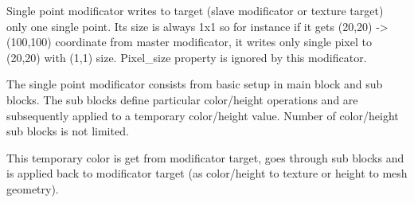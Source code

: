 \documentclass[9pt]{article}
\begin{document}
Single point modificator writes to target (slave modificator
or texture target) only one single point. Its size is always 1x1 so for instance
if it gets (20,20) -> (100,100) coordinate from master modificator, it writes
only single pixel to (20,20) with (1,1) size. Pixel\_size property is ignored 
by this modificator.

The single point modificator consists from basic setup in main block and
sub blocks. The sub blocks define particular color/height operations and 
are subsequently applied to a temporary color/height value. Number of 
color/height sub blocks is not limited.

This temporary color is get from modificator target, goes through sub blocks
and is applied back to modificator target (as color/height to texture or
height to mesh geometry). 
\end{document}
